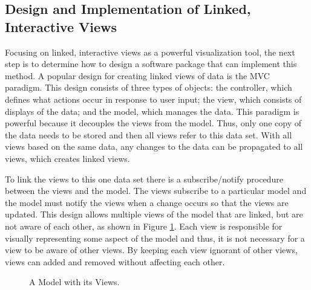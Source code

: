 \documentclass{article}[11pt]
\begin{document}
\subsection{Design and Implementation of Linked, Interactive
  Views}\label{Ssec:Design} 

Focusing on linked, interactive views as a powerful visualization tool, the
next step is to determine how to design a software package that can implement
this method.  A popular design for creating linked views of data is the
MVC paradigm.  This design consists of three types of objects: the controller,
which defines what actions occur in response to user input; the view, which
consists of displays of the data; and the model, which manages the data.  This
paradigm is powerful because it decouples the views from the model.  Thus,
only one copy of the data needs to be stored and then all views refer to this
data set.  With all views based on the same data, any changes to the data can
be propagated to all views, which creates linked views. 

To link the views to this one data set there is a subscribe/notify procedure
between the views and the model.  The views subscribe to a particular model
and the model must notify the views when a change occurs so that the views
are updated.  This design allows multiple views of the model that are
linked, but are not aware of each other, as shown in Figure \ref{Fig:ExMVC}.
Each view is responsible for visually representing some aspect of the model
and thus, it is not necessary for a view to be aware of other views.  By
keeping each view ignorant of other views, views can added and removed without
affecting each other. 

\begin{figure}[ht]
  \begin{center}
    \caption{ A Model with its Views. }
    \label{Fig:ExMVC}
  \end{center}
\end{figure}
\end{document}
